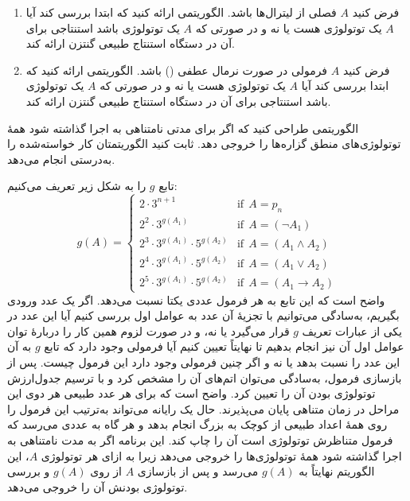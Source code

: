\quad\begin{enumerate}
  \item
  فرض کنید $A$ فصلی از لیترال‌ها باشد. الگوریتمی ارائه کنید که ابتدا بررسی کند آیا $A$ یک توتولوژی هست یا نه و در صورتی که $A$ یک توتولوژی باشد استنتاجی برای آن در دستگاه استنتاج طبیعی گنتزن ارائه کند.
  \item
  فرض کنید $A$ فرمولی در صورت نرمال عطفی () باشد. الگوریتمی ارائه کنید که ابتدا بررسی کند آیا $A$ یک توتولوژی هست یا نه و در صورتی که $A$ یک توتولوژی باشد استنتاجی برای آن در دستگاه استنتاج طبیعی گنتزن ارائه کند.
  \end{enumerate}
  
  \item
  الگوریتمی طراحی کنید که اگر برای مدتی نامتناهی به اجرا گذاشته شود همهٔ توتولوژی‌های منطق گزاره‌ها را خروجی دهد. ثابت کنید الگوریتمتان کار خواسته‌شده را به‌درستی انجام می‌دهد.
  \begin{ans}
  تابع $g$ را به شکل زیر تعریف می‌کنیم:
  $$
  g(A)=
  \begin{cases}
  2\cdot 3^{n+1} & \text{if}~~A = p_n\\
  2^2\cdot 3^{g(A_1)} & \text{if}~~A=(\neg A_1)\\
  2^3\cdot 3^{g(A_1)}\cdot 5^{g(A_2)} & \text{if}~~A=(A_1\wedge A_2) \\
  2^4\cdot 3^{g(A_1)}\cdot 5^{g(A_2)} & \text{if}~~A=(A_1\vee A_2) \\
  2^5\cdot 3^{g(A_1)}\cdot 5^{g(A_2)} & \text{if}~~A=(A_1\rightarrow A_2)
  \end{cases}
  $$
  واضح است که این تابع به هر فرمول عددی یکتا نسبت می‌دهد. اگر یک عدد ورودی بگیریم، به‌سادگی می‌توانیم با تجزیهٔ آن عدد به عوامل اول بررسی کنیم آیا این عدد در یکی از عبارات تعریف $g$ قرار می‌گیرد یا نه، و در صورت لزوم همین کار را دربارهٔ توان عوامل اول آن نیز انجام بدهیم تا نهایتاً تعیین کنیم آیا فرمولی وجود دارد که تابع $g$ به آن این عدد را نسبت بدهد یا نه و اگر چنین فرمولی وجود دارد این فرمول چیست. پس از بازسازی فرمول، به‌سادگی می‌توان اتم‌های آن را مشخص کرد و با ترسیم جدول‌ارزش توتولوژی بودن آن را تعیین کرد. واضح است که برای هر عدد طبیعی هر دوی این مراحل در زمان متناهی پایان می‌پذیرند. حال یک رایانه می‌تواند به‌ترتیب این فرمول را روی همهٔ اعداد طبیعی از کوچک به بزرگ انجام بدهد و هر گاه به عددی می‌رسد که فرمول متناظرش توتولوژی است آن را چاپ کند. این برنامه اگر به مدت نامتناهی به اجرا گذاشته شود همهٔ توتولوژی‌ها را خروجی می‌دهد زیرا به ازای هر توتولوژی $A$، این الگوریتم نهایتاً به
  $g(A)$
  می‌رسد و پس از بازسازی $A$ از روی $g(A)$ و بررسی توتولوژی بودنش آن را خروجی می‌دهد.
  \end{ans}
  